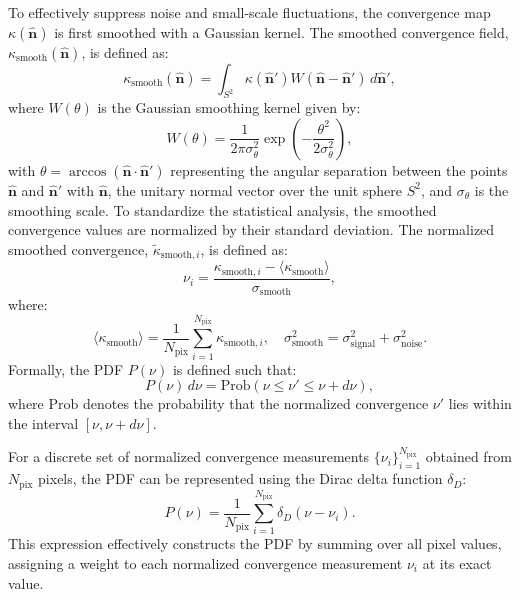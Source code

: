 To effectively suppress noise and small-scale fluctuations, the convergence map $\kappa(\hat{\mathbf{n}})$ is first smoothed with a Gaussian kernel. The smoothed convergence field, $\kappa_{\mathrm{smooth}}(\hat{\mathbf{n}})$, is defined as:
\begin{equation}
    \kappa_{\mathrm{smooth}}(\hat{\mathbf{n}}) = \int_{S^2} \kappa(\hat{\mathbf{n}}') W(\hat{\mathbf{n}} - \hat{\mathbf{n}}') \, d\hat{\mathbf{n}}',
    \label{eq:smoothing}
\end{equation}
where $W(\theta)$ is the Gaussian smoothing kernel given by:
\begin{equation}
    W(\theta) = \frac{1}{2\pi \sigma_{\theta}^2} \exp\left( -\frac{\theta^2}{2 \sigma_{\theta}^2} \right),
    \label{eq:gaussian_kernel}
\end{equation}
with $\theta = \arccos(\hat{\mathbf{n}} \cdot \hat{\mathbf{n}}')$ representing the angular separation between the points $\hat{\mathbf{n}}$ and $\hat{\mathbf{n}}'$ with $\hat{\mathbf{n}}$, the unitary normal vector over the unit sphere $S^2$, and $\sigma_{\theta}$ is the smoothing scale. To standardize the statistical analysis, the smoothed convergence values are normalized by their standard deviation. The normalized smoothed convergence, $\tilde{\kappa}_{\mathrm{smooth}, i}$, is defined as:
\begin{equation}
    \nu_{i} = \frac{\kappa_{\mathrm{smooth}, i} - \langle \kappa_{\mathrm{smooth}} \rangle}{\sigma_{\mathrm{smooth}}},
    \label{eq:kappa_smooth_normalized}
\end{equation}
where:
\begin{equation}
    \langle \kappa_{\mathrm{smooth}} \rangle = \frac{1}{N_{\mathrm{pix}}} \sum_{i=1}^{N_{\mathrm{pix}}} \kappa_{\mathrm{smooth}, i}, \quad \sigma_{\mathrm{smooth}}^2 = \sigma_{\mathrm{signal}}^2 + \sigma_{\mathrm{noise}}^2.
    \label{eq:normalization}
\end{equation}
Formally, the PDF \( P(\nu) \) is defined such that:
\begin{equation}
    P(\nu) \, d\nu = \mathrm{Prob}(\nu \leq \nu' \leq \nu + d\nu),
\end{equation}
where \(\mathrm{Prob}\) denotes the probability that the normalized convergence \(\nu'\) lies within the interval \([\nu, \nu + d\nu]\).

For a discrete set of normalized convergence measurements \(\{\nu_i\}_{i=1}^{N_{\mathrm{pix}}}\) obtained from \(N_{\mathrm{pix}}\) pixels, the PDF can be represented using the Dirac delta function \(\delta_D\):
\begin{equation}
    P(\nu) = \frac{1}{N_{\mathrm{pix}}} \sum_{i=1}^{N_{\mathrm{pix}}} \delta_D(\nu - \nu_i).
    \label{eq:pdf_delta}
\end{equation}
This expression effectively constructs the PDF by summing over all pixel values, assigning a weight to each normalized convergence measurement \(\nu_i\) at its exact value.

